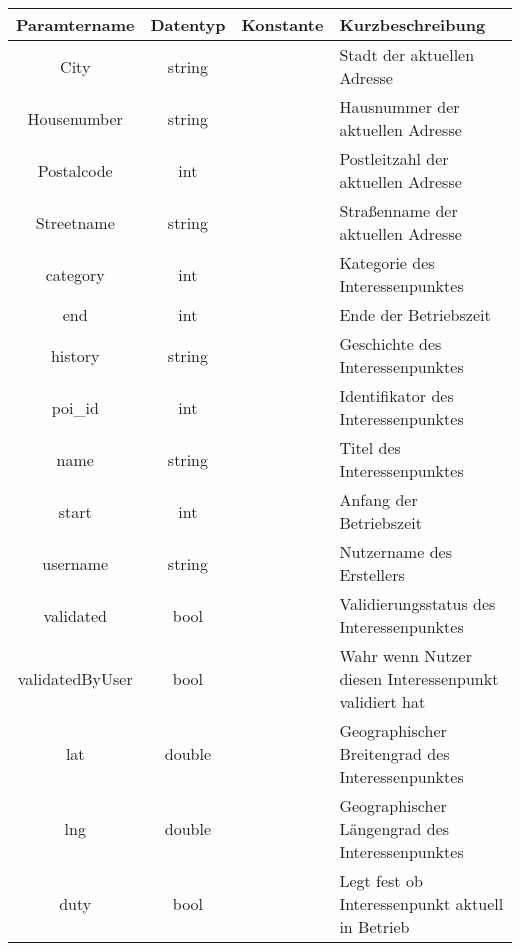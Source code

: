 \begin{table}[H]
	\begin{tabular}{|c|c|c|p{6.5cm}|}
		\hline
		\textbf{Paramtername} & \textbf{Datentyp} & \textbf{Konstante} & \textbf{Kurzbeschreibung}    \\ \hline
		City               & string            &                 & Stadt der aktuellen Adresse \\ \hline
		Housenumber        & string            &                 & Hausnummer der aktuellen Adresse \\ \hline
		Postalcode         & int               &                 & Postleitzahl der aktuellen Adresse \\ \hline
		Streetname         & string            &                 & Straßenname der aktuellen Adresse \\ \hline
		category           & int               &                 & Kategorie des Interessenpunktes \\ \hline
		end                & int               &                 & Ende der Betriebszeit \\ \hline
		history            & string            &                 & Geschichte des Interessenpunktes \\ \hline
		poi\_id            & int               &                 & Identifikator des Interessenpunktes \\ \hline
		name               & string            &                 & Titel des Interessenpunktes \\ \hline
		start              & int               &                 & Anfang der Betriebszeit \\ \hline
		username           & string            &                 & Nutzername des Erstellers \\ \hline
		validated          & bool              &                 & Validierungsstatus des Interessenpunktes \\ \hline
		validatedByUser    & bool              &                 & Wahr wenn Nutzer diesen Interessenpunkt validiert hat \\ \hline
		lat                & double            &                 & Geographischer Breitengrad des Interessenpunktes \\ \hline
		lng                & double            &                 & Geographischer Längengrad  des Interessenpunktes \\ \hline
		duty               & bool              &                 & Legt fest ob Interessenpunkt aktuell in Betrieb \\ \hline
	\end{tabular}
\end{table}

